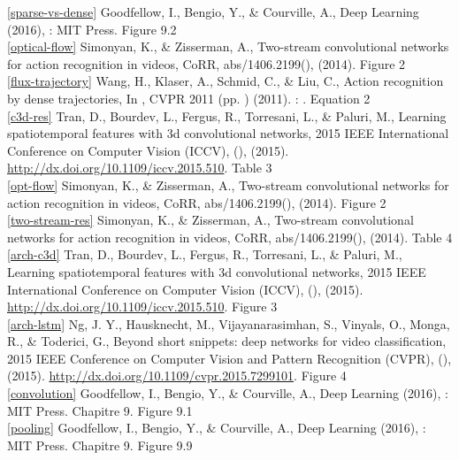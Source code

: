 \documentclass[11pt]{article}
\begin{document}
\ref{sparse-vs-dense} Goodfellow, I., Bengio, Y., \& Courville, A., Deep Learning (2016), : MIT Press. \cite{Goodfellow-et-al-2016} Figure 9.2\\

\ref{optical-flow} Simonyan, K., \& Zisserman, A., Two-stream convolutional networks for action recognition in videos, CoRR, abs/1406.2199(),  (2014). Figure 2\\

\ref{flux-trajectory} Wang, H., Klaser, A., Schmid, C., \& Liu, C., Action recognition by dense trajectories, In , CVPR 2011 (pp. ) (2011). : . Equation 2\\

\ref{c3d-res} Tran, D., Bourdev, L., Fergus, R., Torresani, L., \& Paluri, M., Learning spatiotemporal features with 3d convolutional networks, 2015 IEEE International Conference on Computer Vision (ICCV), (),  (2015).  \url{http://dx.doi.org/10.1109/iccv.2015.510}. Table 3\\

\ref{opt-flow} Simonyan, K., \& Zisserman, A., Two-stream convolutional networks for action recognition in videos, CoRR, abs/1406.2199(),  (2014). Figure 2\\

\ref{two-stream-res} Simonyan, K., \& Zisserman, A., Two-stream convolutional networks for action recognition in videos, CoRR, abs/1406.2199(),  (2014). Table 4\\

\ref{arch-c3d} Tran, D., Bourdev, L., Fergus, R., Torresani, L., \& Paluri, M., Learning spatiotemporal features with 3d convolutional networks, 2015 IEEE International Conference on Computer Vision (ICCV), (),  (2015).  \url{http://dx.doi.org/10.1109/iccv.2015.510}. Figure 3\\

\ref{arch-lstm} Ng, J. Y., Hausknecht, M., Vijayanarasimhan, S., Vinyals, O., Monga, R., \& Toderici, G., Beyond short snippets: deep networks for video classification, 2015 IEEE Conference on Computer Vision and Pattern Recognition (CVPR), (),  (2015).  \url{http://dx.doi.org/10.1109/cvpr.2015.7299101}. Figure 4\\

\ref{convolution} Goodfellow, I., Bengio, Y., \& Courville, A., Deep Learning (2016), : MIT Press. Chapitre 9. Figure 9.1\\

\ref{pooling} Goodfellow, I., Bengio, Y., \& Courville, A., Deep Learning (2016), : MIT Press. Chapitre 9. Figure 9.9\\
\end{document}
